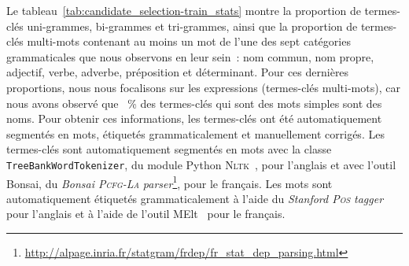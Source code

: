      Le tableau~\ref{tab:candidate_selection-train_stats} montre la proportion
      de termes-clés uni-grammes, bi-grammes et tri-grammes, ainsi que la
      proportion de termes-clés multi-mots contenant au moins un mot de l'une
      des sept catégories grammaticales que nous observons en leur sein~: nom
      commun, nom propre, adjectif, verbe, adverbe, préposition et déterminant.
      Pour ces dernières proportions, nous nous focalisons sur les expressions
      (termes-clés multi-mots), car nous avons observé que \TODO{\dots}~\% des
      termes-clés qui sont des mots simples sont des noms. Pour obtenir ces
      informations, les termes-clés ont été automatiquement segmentés en mots,
      étiquetés grammaticalement et manuellement corrigés. Les termes-clés sont
      automatiquement segmentés en mots avec la classe
      \texttt{TreeBankWordTokenizer}, du module Python
      \textsc{Nltk}~\cite[\textit{Natural Language ToolKit}]{bird2009nltk}, pour
      l'anglais et avec l'outil Bonsai, du \textit{Bonsai \textsc{Pcfg-La}
      parser}\footnote{\url{http://alpage.inria.fr/statgram/frdep/fr_stat_dep_parsing.html}},
      pour le français. Les mots sont automatiquement étiquetés grammaticalement
      à l'aide du \textit{Stanford \textsc{Pos}
      tagger}~\cite{toutanova2003stanfordpostagger} pour l'anglais et à l'aide
      de l'outil MElt~\cite{denis2009melt} pour le français.
